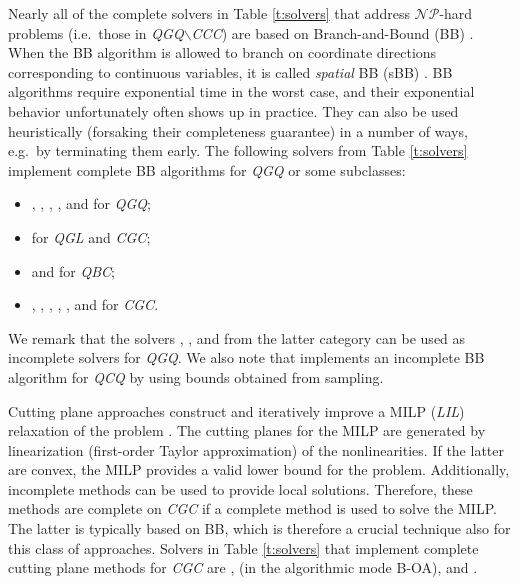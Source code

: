 Nearly all of the complete solvers in Table \ref{t:solvers} that address $\mathcal{NP}$-hard problems (i.e.~those in \textit{QGQ}$\smallsetminus$\textit{CCC}) are based on Branch-and-Bound (BB) \cite{land_doig}. When the BB algorithm is allowed to branch on coordinate directions corresponding to continuous variables, it is called \emph{spatial} BB (sBB) \cite{dakin,BeLeLiMaWa08}. BB algorithms require exponential time in the worst case, and their exponential behavior unfortunately often shows up in practice. They can also be used heuristically (forsaking their completeness guarantee) in a number of ways, e.g.~by terminating them early. The following solvers from Table \ref{t:solvers} implement complete BB algorithms for \textit{QGQ} or some subclasses: 
%
\begin{itemize}
 \item \antigone, \baron, \couenne, \lindo, and \scip for \textit{QGQ};
 \item \cplex for \textit{QGL} and \textit{CGC};
%
 \item {\gurobi and \xpress for \textit{QBC};}
%
 \item \bonmin, \gurobi, \knitro, \mosek, \sbb, and \xpress for \textit{CGC}.
\end{itemize}
%
We remark that {the solvers \bonmin, \knitro, and \sbb from} the latter category can be used as incomplete solvers for \textit{QGQ}. We also note that \lgo implements an incomplete BB algorithm for \textit{QCQ} by using bounds obtained from sampling.

Cutting plane approaches construct and iteratively improve a MILP (\textit{LIL}) relaxation of the problem \cite{DuGr86,WePoe02}. The cutting planes for the MILP are generated by linearization (first-order Taylor approximation) of the nonlinearities. If the latter are convex, the MILP provides a valid lower bound for the problem. Additionally, incomplete methods can be used to provide local solutions. Therefore, these methods are complete on \textit{CGC} if a complete method is used to solve the MILP. The latter is typically based on BB, which is therefore a crucial technique also for this class of approaches. Solvers in Table \ref{t:solvers} that implement complete cutting plane methods for \textit{CGC} are \alphaecp, \bonmin (in the algorithmic mode B-OA), and \dicopt.


